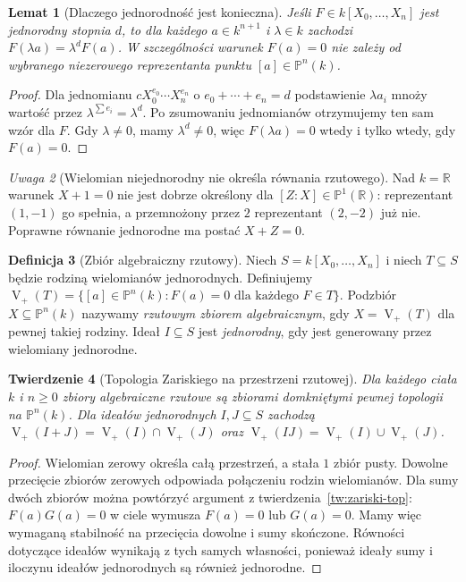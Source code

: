 \documentclass[11pt,a4paper,openany]{report}
\numberwithin{equation}{section}
\theoremstyle{plain}
\newtheorem{twierdzenie}{Twierdzenie}[section]
\newtheorem{lemat}[twierdzenie]{Lemat}
\theoremstyle{definition}
\newtheorem{definicja}[twierdzenie]{Definicja}
\theoremstyle{remark}
\newtheorem{uwaga}[twierdzenie]{Uwaga}
\newcommand{\R}{\mathbb R}
\newcommand{\PP}{\mathbb P}
\newcommand{\V}{\operatorname V}
\begin{document}
\begin{lemat}[Dlaczego jednorodność jest konieczna]
Jeśli $F\in k[X_0,\dots,X_n]$ jest jednorodny stopnia $d$,
to dla każdego $a\in k^{n+1}$ i $\lambda\in k$ zachodzi
$F(\lambda a)=\lambda^dF(a)$. W szczególności warunek
$F(a)=0$ nie zależy od wybranego niezerowego reprezentanta
punktu $[a]\in\PP^n(k)$.
\end{lemat}
\begin{proof}
Dla jednomianu $cX_0^{e_0}\cdots X_n^{e_n}$
o $e_0+\cdots+e_n=d$ podstawienie $\lambda a_i$
mnoży wartość przez $\lambda^{\sum e_i}=\lambda^d$.
Po zsumowaniu jednomianów otrzymujemy ten sam wzór dla $F$.
Gdy $\lambda\ne0$, mamy $\lambda^d\ne0$,
więc $F(\lambda a)=0$ wtedy i tylko wtedy, gdy $F(a)=0$.
\end{proof}

\begin{uwaga}[Wielomian niejednorodny nie określa równania rzutowego]
Nad $k=\R$ warunek $X+1=0$ nie jest dobrze określony dla
$[Z:X]\in\PP^1(\R)$: reprezentant $(1,-1)$ go spełnia,
a przemnożony przez $2$ reprezentant $(2,-2)$ już nie.
Poprawne równanie jednorodne ma postać $X+Z=0$.
\end{uwaga}

\begin{definicja}[Zbiór algebraiczny rzutowy]
Niech $S=k[X_0,\dots,X_n]$ i niech $T\subseteq S$ będzie
rodziną wielomianów jednorodnych. Definiujemy
$\V_+(T)=\{[a]\in\PP^n(k):F(a)=0\text{ dla każdego }F\in T\}$.
Podzbiór $X\subseteq\PP^n(k)$ nazywamy \emph{rzutowym
zbiorem algebraicznym}, gdy $X=\V_+(T)$ dla pewnej takiej rodziny.
Ideał $I\subseteq S$ jest \emph{jednorodny}, gdy jest generowany
przez wielomiany jednorodne.
\end{definicja}

\begin{twierdzenie}[Topologia Zariskiego na przestrzeni rzutowej]
\label{tw:projective-zariski}
Dla każdego ciała $k$ i $n\ge0$ zbiory algebraiczne rzutowe
są zbiorami domkniętymi pewnej topologii na $\PP^n(k)$.
Dla ideałów jednorodnych $I,J\subseteq S$ zachodzą
$\V_+(I+J)=\V_+(I)\cap\V_+(J)$ oraz
$\V_+(IJ)=\V_+(I)\cup\V_+(J)$.
\end{twierdzenie}
\begin{proof}
Wielomian zerowy określa całą przestrzeń, a stała $1$
zbiór pusty. Dowolne przecięcie zbiorów zerowych odpowiada
połączeniu rodzin wielomianów. Dla sumy dwóch zbiorów
można powtórzyć argument z twierdzenia~\ref{tw:zariski-top}:
$F(a)G(a)=0$ w ciele wymusza $F(a)=0$ lub $G(a)=0$.
Mamy więc wymaganą stabilność na przecięcia dowolne i sumy
skończone. Równości dotyczące ideałów wynikają z tych samych
własności, ponieważ ideały sumy i iloczynu ideałów jednorodnych
są również jednorodne.
\end{proof}
\end{document}
